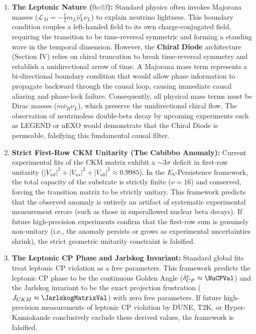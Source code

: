 \begin{enumerate}
    \item \textbf{The Leptonic Nature ($0\nu\beta\beta$):} Standard physics often invokes Majorana masses ($\mathcal{L}_{M} = -\frac{1}{2}m_L \bar{\nu}_L^c \nu_L$) to explain neutrino lightness. This boundary condition couples a left-handed field to its own charge-conjugated field, requiring the transition to be time-reversal symmetric and forming a standing wave in the temporal dimension. However, the \textbf{Chiral Diode} architecture (Section IV) relies on chiral truncation to break time-reversal symmetry and establish a unidirectional arrow of time. A Majorana mass term represents a bi-directional boundary condition that would allow phase information to propagate backward through the causal loop, causing immediate causal aliasing and phase-lock failure. Consequently, all physical mass terms must be Dirac masses ($m \bar{\nu}_R \nu_L$), which preserve the unidirectional chiral flow. The observation of neutrinoless double-beta decay by upcoming experiments such as LEGEND or nEXO would demonstrate that the Chiral Diode is permeable, falsifying this fundamental causal filter.
    
    \item \textbf{Strict First-Row CKM Unitarity (The Cabibbo Anomaly):} Current experimental fits of the CKM matrix exhibit a $\sim 3\sigma$ deficit in first-row unitarity ($|V_{ud}|^2 + |V_{us}|^2 + |V_{ub}|^2 \approx 0.9985$). In the $E_8$-Persistence framework, the total capacity of the substrate is strictly finite ($\nu=16$) and conserved, forcing the transition matrix to be strictly unitary. This framework predicts that the observed anomaly is entirely an artifact of systematic experimental measurement errors (such as those in superallowed nuclear beta decays). If future high-precision experiments confirm that the first-row sum is genuinely non-unitary (i.e., the anomaly persists or grows as experimental uncertainties shrink), the strict geometric unitarity constraint is falsified.
    
    \item \textbf{The Leptonic CP Phase and Jarlskog Invariant:} Standard global fits treat leptonic CP violation as a free parameters. This framework predicts the leptonic CP phase to be the continuous Golden Angle ($\delta_{CP}^\nu \approx \mathbf{\NuCPVal}$) and the Jarlskog invariant to be the exact projection frustration ($J_{CKM} \approx \mathbf{\JarlskogMatrixVal}$) with zero free parameters. If future high-precision measurements of leptonic CP violation by DUNE, T2K, or Hyper-Kamiokande conclusively exclude these derived values, the framework is falsified.
    

\end{enumerate}
